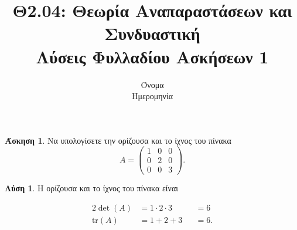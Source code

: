 \documentclass[12pt,a4paper,reqno]{amsart}
\title[ΦΑ 1]{Θ2.04: Θεωρία Αναπαραστάσεων και Συνδυαστική \\ Λύσεις Φυλλαδίου Ασκήσεων 1}
\author[Όνομα]{Όνομα \\ Ημερομηνία}
\theoremstyle{definition}
\newtheorem{exercise}{Άσκηση}
\newtheorem*{solution}{Λύση}
\numberwithin{exercise}{section}
\newcommand{\trace}{\mathrm{tr}}
\begin{document}
\begingroup
\def\uppercasenonmath#1{} %
\let\MakeUppercase\relax %
\maketitle
\endgroup

\setcounter{section}{1} 
\thispagestyle{empty}

\begin{exercise}
    \label{ex:1.1}
    Να υπολογίσετε την ορίζουσα και το ίχνος του πίνακα 
    \[
    A = 
    \begin{pmatrix}
        1 & 0 & 0 \\
        0 & 2 & 0 \\
        0 & 0 & 3
    \end{pmatrix}.
    \]
\end{exercise}

\begin{solution}
Η ορίζουσα και το ίχνος του πίνακα είναι 

\begin{alignat*}{2}
    \det(A)   & = 1 \cdot 2 \cdot 3 && = 6 \\
    \trace(A) & = 1 + 2 + 3         && = 6.
\end{alignat*}

\end{solution}
\end{document}
